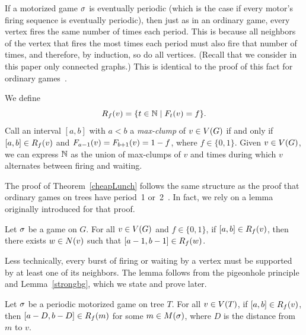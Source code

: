 If a motorized game $\s$ is eventually periodic (which is the case if every
motor's firing sequence is eventually periodic), then just as in an ordinary
game, every vertex fires the same number of times each period. This is because
all neighbors of the vertex that fires the most times each period must also
fire that number of times, and therefore, by induction, so do all
vertices. (Recall that we consider in this paper only connected graphs.) This
is identical to the proof of this fact for ordinary games~\cite{jiang}.

We define
\[
  \pat{v}{f} = \set{t \in \nats}{\firing{v}{t} = f}.
\]
Call an interval $[a, b]$ with $a < b$ a \emph{max-clump} of $v \in \V$ if and
only if $[a, b] \in \pat{v}{f}$ and $\firing{v}{a-1} = \firing{v}{b+1} = 1-f$,
where $f \in \{0,1\}$. Given $v \in \V$, we can express $\nats$ as the union of
max-clumps of $v$ and times during which $v$ alternates between firing and
waiting.

The proof of Theorem~\ref{cheapLunch} follows the same structure as the proof
that ordinary games on trees have period~1 or~2~\cite{bitarGoles}. In fact, we
rely on a lemma originally introduced for that proof.

\begin{lem} \label{bitarGoles}
Let $\s$ be a game on $G$. For all $v \in \V$ and $f \in \{0,1\}$, if $[a, b]
\in \pat{v}{f}$, then there exists $w \in \N{v}$ such that $[a-1, b-1] \in
\pat{w}{f}$.
\end{lem}

Less technically, every burst of firing or waiting by a vertex must be
supported by at least one of its neighbors. The lemma follows from the
pigeonhole principle and Lemma~\ref{strongbg}, which we state and prove later.

\begin{thm} \label{cheapLunch}
Let $\s$ be a periodic motorized game on tree $T$. For all $v \in \V[T]$, if
$[a, b] \in \pat{v}{f}$, then $[a-D, b-D] \in \pat{m}{f}$ for some $m \in
\mots$, where $D$ is the distance from $m$ to $v$.
\end{thm}

